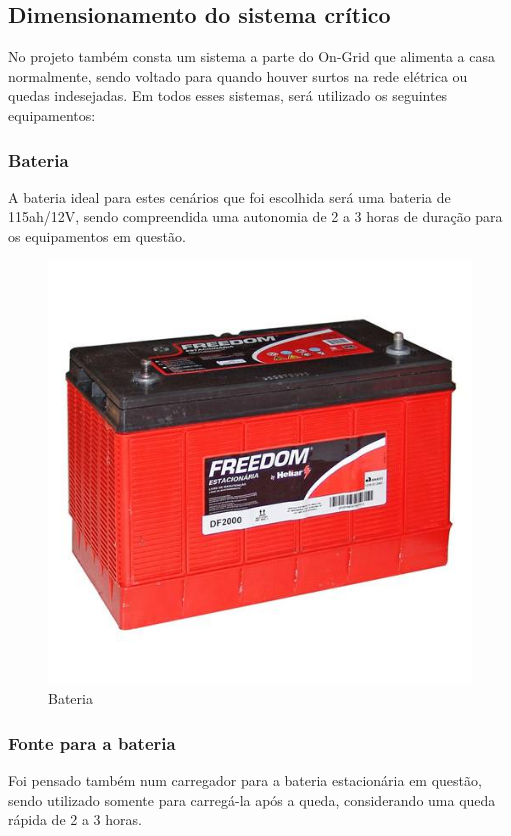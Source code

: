 \subsection{Dimensionamento do sistema crítico}
\par No projeto também consta um sistema a parte do On-Grid que alimenta a casa normalmente, sendo voltado para quando houver surtos na rede elétrica ou quedas indesejadas. Em todos esses sistemas, será utilizado os seguintes equipamentos:

\subsubsection{Bateria}
\par A bateria ideal para estes cenários que foi escolhida será uma bateria de 115ah/12V, sendo compreendida uma autonomia de 2 a 3 horas de duração para os equipamentos em questão.

\begin{figure}[!h]
\centering
\caption{Bateria}
\includegraphics[width=\textwidth]{figuras/bateria}
\end{figure}

\subsubsection{Fonte para a bateria}
\par Foi pensado também num carregador para a bateria estacionária em questão, sendo utilizado somente para carregá-la após a queda, considerando uma queda rápida de 2 a 3 horas.

